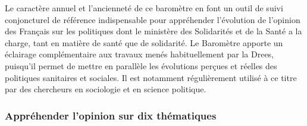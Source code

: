 \documentclass[12pt,a4paper]{reedthesis}
\begin{document}
Le caractère annuel et l'ancienneté de ce baromètre en font un outil de suivi conjoncturel de référence indispensable pour appréhender l'évolution de l'opinion des Français sur les politiques dont le ministère des Solidarités et de la Santé a la charge, tant en matière de santé que de solidarité. Le Baromètre apporte un éclairage complémentaire aux travaux menés habituellement par la Drees, puisqu'il permet de mettre en parallèle les évolutions perçues et réelles des politiques sanitaires et sociales. Il est notamment régulièrement utilisé à ce titre par des chercheurs en sociologie et en science politique.

\hypertarget{appruxe9hender-lopinion-sur-dix-thuxe9matiques}{%
\subsubsection{Appréhender l'opinion sur dix thématiques}\label{appruxe9hender-lopinion-sur-dix-thuxe9matiques}}
\end{document}
